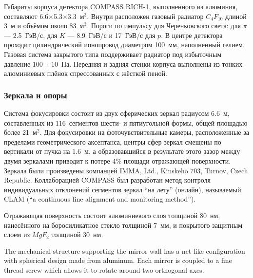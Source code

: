 Габариты корпуса детектора COMPASS \mbox{RICH-1}, выполненного из алюминия, составляют 6.6$\times$5.3$\times$3.3~м$^3$. Внутри расположен газовый радиатор $C_{4}F_{10}$ длиной 3~м и объёмом около 83~м$^3$. Пороги по импульсу для Черенковского света: для $\pi$ --- 2.5~ГэВ/с, для $K$ --- 8.9~ГэВ/с и 17~ГэВ/с для $p$. В центре детектора проходит цилиндрический ионопровод диаметром 100~мм, наполненный гелием.
Газовая система закрытого типа поддерживает радиатор под избыточным давление $100\pm10$~Па.
Передняя и задняя стенки корпуса выполнены из тонких алюминиевых плёнок спрессованных с жёсткой пеной. \todo

\subsubsection{Зеркала и опоры}

Система фокусировки состоит из двух сферических зеркал радиусом 6.6~м, составленных из 116~сегментов шести- и пятиугольной формы, общей площадью более 21~м$^2$. Для фокусировки на фоточувствительные камеры, расположенные за пределами геометрического аксептанса, центры сфер зеркал смещены по вертикали от пучка на 1.6~м, а образовавшийся в результате этого зазор между двумя зеркалами приводит к потере 4\% площади отражающей поверхности. Зеркала были произведены компанией IMMA, Ltd., Kinskeho 703, Turnov, Czech Republic.
Коллаборацией COMPASS был разработан метод контроля индивидуальных отклонений сегментов зеркал ``на лету'' (онлайн), называемый CLAM (``a continuous line alignment and monitoring method'').

Отражающая поверхность состоит алюминиевого слоя толщиной 80~нм, нанесённого на боросиликатное стекло толщиной 7~мм, и покрытого защитным слоем из $MgF_{2}$ толщиной 30~нм.

The mechanical structure supporting the mirror wall has a net-like configuration with spherical design made from aluminum. Each mirror is coupled to a fine thread screw which allows it to rotate around two orthogonal axes.

